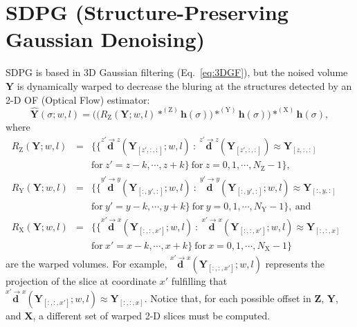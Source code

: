\documentclass{article}
\begin{document}
\section{SDPG (Structure-Preserving Gaussian Denoising) \cite{gonzalez2023structure}}

SDPG is based in 3D Gaussian filtering (Eq.~\ref{eq:3DGF}), but the noised
volume ${\mathbf Y}$ is dynamically warped to decrease the bluring at the
structures detected by an 2-D OF (Optical Flow) estimator:
\begin{equation}
  \hat{\mathbf{Y}}(\sigma; w, l) = \Big(\big(R_\text{Z}(\mathbf{Y}; w, l)*^{(\text{Z})}{\mathbf h}(\sigma)\big)*^{(\text{Y})}{\mathbf h}(\sigma)\Big)*^{(\text{X})}{\mathbf h}(\sigma),
    \label{eq:SDPG}
\end{equation}
where
\begin{equation*}
    \begin{array}{rclll}
    R_\text{Z}(\mathbf{Y}; w, l) & = & \big\{ \{ \overset{z'\rightarrow z}{\mathbf d}({\mathbf Y}_{[z',:,:]}; w, l)~:~\overset{z'\rightarrow z}{\mathbf d}({\mathbf Y}_{[z',:,:]})\approx{\mathbf Y}_{[z,:,:]} & \\ & & \text{for}
 ~z'=z-k,\cdots,z+k\} ~\text{for}~z=0,1,\cdots,N_\text{Z}-1\big\}, \\
    R_\text{Y}(\mathbf{Y}; w, l) & = & \big\{ \{ \overset{y'\rightarrow y}{\mathbf d}({\mathbf Y}_{[:,y',:]}; w, l)~:~\overset{y'\rightarrow y}{\mathbf d}({\mathbf Y}_{[:,y',:]}; w, l)\approx{\mathbf Y}_{[:,y,:]} & \\ & & \text{for}
 ~y'=y-k,\cdots,y+k\} ~\text{for}~y=0,1,\cdots,N_\text{Y}-1\big\},~\text{and} \\
    R_\text{X}(\mathbf{Y}; w, l) & = & \big\{ \{ \overset{x'\rightarrow x}{\mathbf d}({\mathbf Y}_{[:,:,x']}; w, l)~:~\overset{x'\rightarrow x}{\mathbf d}({\mathbf Y}_{[:,:,x']}; w, l)\approx{\mathbf Y}_{[:,:,x]} & \\ & & \text{for}
 ~x'=x-k,\cdots,x+k\} ~\text{for}~x=0,1,\cdots,N_\text{X}-1\big\}
    \end{array}
\end{equation*}
are the warped volumes. For example,
$\overset{x'\rightarrow x}{\mathbf d}({\mathbf Y}_{[:,:,x']}; w, l)$
represents the projection of the slice at coordinate $x'$ fulfilling
that
$\overset{x'\rightarrow x}{\mathbf d}({\mathbf Y}_{[:,:,x']}; w,
l)\approx{\mathbf Y}_{[:,:,x]}$. Notice that, for each possible offset
in ${\mathbf Z}$, ${\mathbf Y}$, and ${\mathbf X}$, a different set of
warped 2-D slices must be computed.
\end{document}
